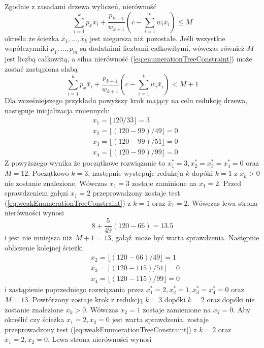 Zgodnie z zasadami drzewa wyliczeń, nierówność
\begin{equation} \label{eq:enumerationTreeConstraint}
  \sum_{i=1}^k p_x\bar{x}_i + \frac{p_{k+1}}{w_{k+1}}(c - \sum_{i=1}^kw_i\bar{x}_i) \le M
\end{equation}
określa że ścieżka $\bar{x}_1, \dots, \bar{x}_k$ jest niegorsza niż pozostałe. Jeśli wszystkie współczynniki $p_1,\dots,p_m$ są dodatnimi liczbami całkowitymi, wówczas również $M$ jest liczbą całkowitą, a silna nierówność (\ref{eq:enumerationTreeConstraint}) może zostać zastąpiona słabą
\begin{equation} \label{eq:weakEnumerationTreeConstraint}
  \sum_{i=1}^k p_x\bar{x}_i + \frac{p_{k+1}}{w_{k+1}}(c - \sum_{i=1}^kw_i\bar{x}_i) < M + 1
\end{equation}
Dla wcześniejszego przykładu powyższy krok mający na celu redukcję drzewa, następuje inicjalizacja zmiennych:
\begin{equation*}
  \begin{aligned}
    & x_1 = \lfloor120/33\rfloor = 3 \\
    & x_2 = \lfloor(120-99)/49\rfloor = 0 \\
    & x_3 = \lfloor(120-99)/51\rfloor = 0 \\
    & x_4 = \lfloor(120-99)/99\rfloor = 0
  \end{aligned}
\end{equation*}
Z powyższego wynika że początkowe rozwiązanie to $x_1^* = 3, x_2^*=x_3^*=x_4^*=0$ oraz $M = 12$. Początkowo $k=3$, następnie wystepuje redukcja $k$ dopóki $k=1$ z $x_k > 0$ nie zostanie znalezione. Wówczas $x_1=3$ zostaje zaminione na $x_1=2$. Przed sprawdzeniem gałęzi $x_1=2$ przeprowadzony zostaje test (\ref{eq:weakEnumerationTreeConstraint}) z $k=1$ oraz $\bar{x}_1 = 2$.
Wówczas lewa strona nierówności wynosi
\begin{equation*}
  8 + \frac{5}{49}(120-66) = 13.5
\end{equation*}
i jest nie mniejsza niż $M + 1 = 13$, gałąź może być warta sprawdzenia.
Następnie obliczenie kolejnej ścieżki
\begin{equation*}
  \begin{aligned}
    & x_2 = \lfloor(120-66)/49\rfloor = 1 \\
    & x_3 = \lfloor(120-115)/51\rfloor = 0 \\
    & x_4 = \lfloor(120-115)/99\rfloor = 0
  \end{aligned}
\end{equation*}
i zastąpienie poprzedniego rozwiązania przez $x_1^* = 2, x_2^*=1, x_3^*=x_4^*=0$ oraz $M = 13$. Powtórzony zostaje krok z redukcją $k=3$ dopóki $k=2$ oraz dopóki nie zostanie znalezione $x_k>0$. Wówczas $x_2=1$ zostaje zamienione na $x_2=0$. Aby określić czy ścieżka $x_1=2, x_2=0$ jest warta sprawdzenia, zostaje przeprowadzony test (\ref{eq:weakEnumerationTreeConstraint}) z $k=2$ oraz $\bar{x}_1 = 2, \bar{x}_2 = 0$. Lewa strona nierówności wynosi

